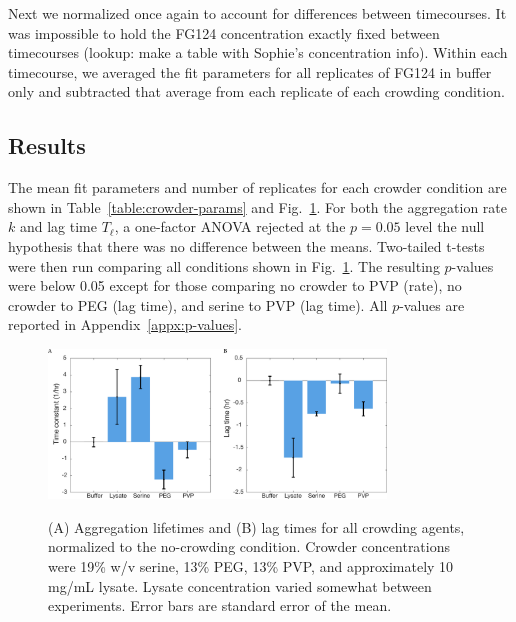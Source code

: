 Next we normalized once again to account for differences between timecourses.  It was impossible to hold the FG124 concentration exactly fixed between timecourses (lookup: make a table with Sophie's concentration info).   Within each timecourse, we averaged the fit parameters for all replicates of FG124 in buffer only and subtracted that average from each replicate of each crowding condition.

\subsection{Results}

The mean fit parameters and number of replicates for each crowder condition are shown in Table~\ref{table:crowder-params} and Fig.~\ref{fig:tht-all-conditions}.  For both the aggregation rate $k$ and lag time $T_\ell$, a one-factor ANOVA rejected at the $p=0.05$ level the null hypothesis that there was no difference between the means.  Two-tailed t-tests were then run comparing all conditions shown in Fig.~\ref{fig:tht-all-conditions}.  The resulting $p$-values were below 0.05 except for those comparing no crowder to PVP (rate), no crowder to PEG (lag time), and serine to PVP (lag time).  All $p$-values are reported in Appendix~\ref{appx:p-values}.


\begin{figure}
\caption{(A) Aggregation lifetimes and (B) lag times for all crowding agents, normalized to the no-crowding condition.  Crowder concentrations were 19\% w/v serine, 13\% PEG, 13\% PVP, and approximately 10 mg/mL lysate.  Lysate concentration varied somewhat between experiments. Error bars are standard error of the mean.}
\centering
\includegraphics[width=0.8\textwidth]{figs/ch05/barCharts.pdf}
\label{fig:tht-all-conditions}
\end{figure}

